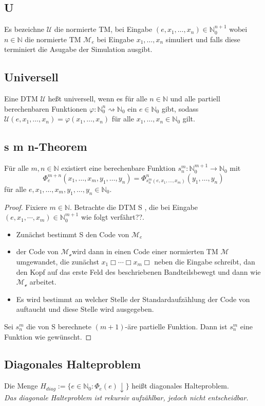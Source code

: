 \subsection{U}
    Es bezeichne \(\mathcal{U}\) die normierte TM, bei Eingabe \((e,x_1,\dots,x_n)\in\mathbb{N}_0^{n+1}\) wobei \(n\in\mathbb{N}\) die normierte TM \(\mathcal{M}_e\)
    bei Eingabe \(x_1,\dots,x_n\) simuliert und falls diese terminiert die Asugabe der Simulation ausgibt.
\subsection{Universell}
    Eine DTM \(\mathcal{U}\) heßt universell, wenn es für alle \(n\in\mathbb{N}\) und alle partiell berechenbaren Funktionen \(\varphi:\mathbb{N}_0^n\rightsquigarrow\mathbb{N}_0\) 
    ein \(e\in\mathbb{N}_0\) gibt, sodass \(\mathcal{U}(e,x_1,\dots,x_n)=\varphi(x_1,\dots,x_n)\) für alle \(x_1,\dots,x_n\in\mathbb{N}_0\) gilt.
\subsection{s m n-Theorem}
    Für alle \(m,n\in\mathbb{N}\) existiert eine berechenbare Funktion \(s_n^m:\mathbb{N}_0^{m+1}\to\mathbb{N}_0\) mit 
    \[\Phi_e^{m+n}(x_1,\dots,x_m,y_1,\dots,y_n)=\Phi^n_{s_n^m(e,x_1,\dots,x_m)}(y_1,\dots,y_n)\]
    für alle \(e,x_1,\dots,x_m,y_1,\dots,y_n\in\mathbb{N}_0\).\par\bigskip
    \begin{proof}
        Fixiere $m \in \mathbb{N}$. Betrachte die DTM S , die bei Eingabe $(e, x_1, \cdots, x_m) \in \mathbb{N}_0^{m+1}$ wie folgt verfährt??.
\begin{itemize}
  \item Zunächst bestimmt S den Code von $\mathcal{M}_e$ 
  \item der Code von $\mathcal{M_e}$wird dann in einen Code einer normierten TM $\mathcal{M}$ umgewandet, die zunächst $x_1\Box\cdots\Box x_m\Box$ neben die Eingabe schreibt, dan den Kopf auf das erste Feld des beschriebenen Bandteilsbewegt und dann wie $\mathcal{M_e}$ arbeitet.
  \item Es wird bestimmt an welcher Stelle der Standardaufzählung der Code von auftaucht und diese Stelle wird ausgegeben.
\end{itemize}
Sei $s_n^m$ die von S berechnete $(m+1)$-äre partielle Funktion. Dann ist $s_n^m$ eine Funktion wie gewünscht.
    \end{proof}
\subsection{Diagonales Halteproblem}
    Die Menge \(H_{diag}:=\{e\in\mathbb{N}_0:\Phi_e(e)\downarrow\}\) heißt diagonales Halteproblem.\\
    \textit{Das diagonale Halteproblem ist rekursiv aufzählbar, jedoch nicht entscheidbar.}
